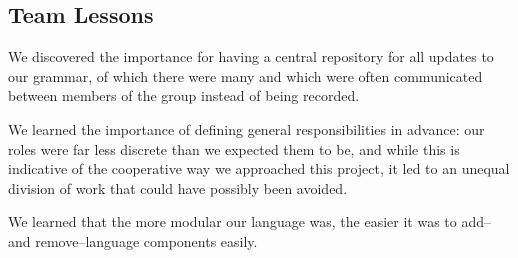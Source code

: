 \subsection{Team Lessons}
We discovered the importance for having a central repository for all
updates to our grammar, of which there were many and which were often
communicated between members of the group instead of being recorded.

We learned the importance of defining general responsibilities in
advance: our roles were far less discrete than we expected them to be,
and while this is indicative of the cooperative way we approached this
project, it led to an unequal division of work that could have
possibly been avoided.  

We learned that the more modular our language was, the easier it was
to add--and remove--language components easily. 


